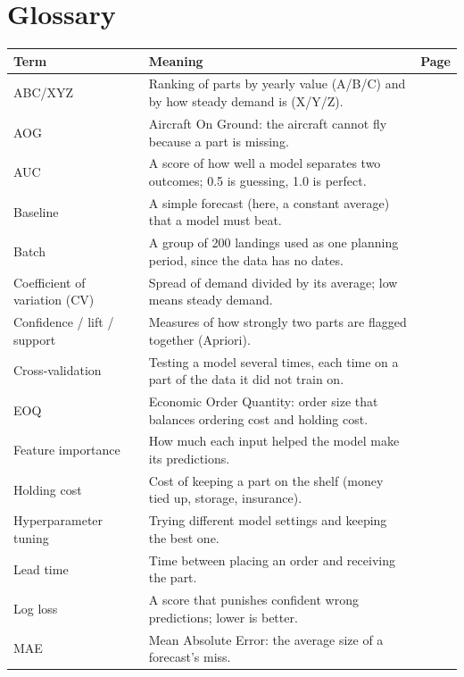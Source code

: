 \documentclass[12pt,oneside]{report}
\begin{document}
\chapter*{Glossary}
\begin{singlespace}
\small
\begin{longtable}{@{}p{3.6cm}p{9.2cm}r@{}}
\toprule
\textbf{Term} & \textbf{Meaning} & \textbf{Page}\\
\midrule
\endhead
ABC/XYZ & Ranking of parts by yearly value (A/B/C) and by how steady demand is (X/Y/Z). & \pageref{gl:abcxyz}\\
AOG & Aircraft On Ground: the aircraft cannot fly because a part is missing. & \pageref{gl:aog}\\
AUC & A score of how well a model separates two outcomes; 0.5 is guessing, 1.0 is perfect. & \pageref{gl:auc}\\
Baseline & A simple forecast (here, a constant average) that a model must beat. & \pageref{gl:baseline}\\
Batch & A group of 200 landings used as one planning period, since the data has no dates. & \pageref{gl:batch}\\
Coefficient of variation (CV) & Spread of demand divided by its average; low means steady demand. & \pageref{gl:cv}\\
Confidence / lift / support & Measures of how strongly two parts are flagged together (Apriori). & \pageref{gl:support}\\
Cross-validation & Testing a model several times, each time on a part of the data it did not train on. & \pageref{gl:cv5}\\
EOQ & Economic Order Quantity: order size that balances ordering cost and holding cost. & \pageref{gl:eoq}\\
Feature importance & How much each input helped the model make its predictions. & \pageref{gl:fi}\\
Holding cost & Cost of keeping a part on the shelf (money tied up, storage, insurance). & \pageref{gl:holding}\\
Hyperparameter tuning & Trying different model settings and keeping the best one. & \pageref{gl:tuning}\\
Lead time & Time between placing an order and receiving the part. & \pageref{gl:leadtime}\\
Log loss & A score that punishes confident wrong predictions; lower is better. & \pageref{gl:logloss}\\
MAE & Mean Absolute Error: the average size of a forecast's miss. & \pageref{gl:mae}\\

\end{longtable}
\end{singlespace}
\end{document}
